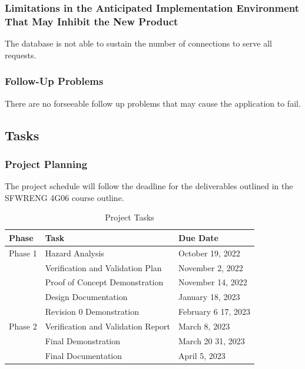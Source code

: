 \documentclass[12pt]{article}
\begin{document}
\subsubsection{Limitations in the Anticipated Implementation Environment That May Inhibit the New Product}

The database is not able to sustain the number of connections to serve all requests.

\subsubsection{Follow-Up Problems}

There are no forseeable follow up problems that may cause the application to fail.

\subsection{Tasks}
\subsubsection{Project Planning}
The project schedule will follow the deadline for the deliverables outlined in the SFWRENG 4G06
course outline.

\begin{table}[H]
	\centering
	\caption{Project Tasks}
	\vspace{5pt}
	\begin{tabular}{|p{}|p{}|p{}|}
		\hline
		\textbf{Phase} & \textbf{Task}                      & \textbf{Due Date}                 \\
		\hline
		Phase 1        & Hazard Analysis                    & October 19, 2022                  \\
		\cline{2-3}    & Verification and Validation Plan   & November 2, 2022                  \\
		\cline{2-3}    & Proof of Concept Demonstration     & November 14, 2022                 \\
		\cline{2-3}    & Design Documentation               & January 18, 2023                  \\
		\cline{2-3}    & Revision 0 Demonstration           & February 6 \textemdash{} 17, 2023 \\
		\hline
		Phase 2        & Verification and Validation Report & March 8, 2023                     \\
		\cline{2-3}    & Final Demonstration                & March 20 \textemdash{} 31, 2023   \\
		\cline{2-3}    & Final Documentation                & April 5, 2023                     \\
		\hline
	\end{tabular}

	\label{project_tasks}
\end{table}
\end{document}
